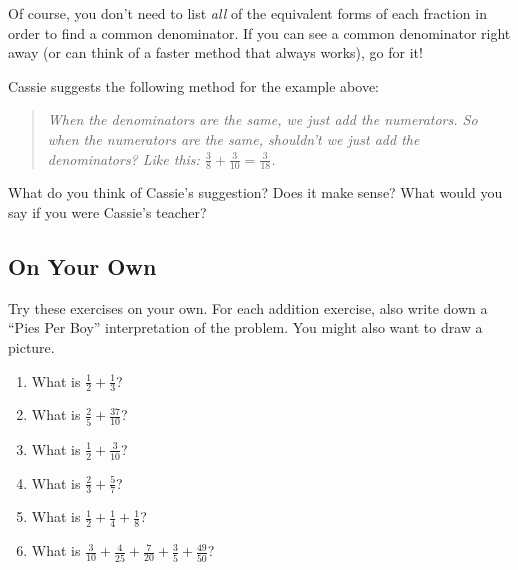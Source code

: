 Of course, you don't need to list \emph{all} of the equivalent forms of each
fraction in order to find a common denominator. If you can see a common
denominator right away (or can think of a faster method that always works), go for it!

\begin{thinkpair*}
Cassie suggests the following method for the example above:

\begin{quotation}
\emph{When the denominators are the same, we just add the numerators.  So when the numerators are the same, shouldn't we just add the denominators?  Like this: $\frac 38 + \frac 3{10} = \frac 3{18}$.
}\end{quotation}

What do you think of Cassie's suggestion?  Does it make sense?  What would you say if you were Cassie's teacher?
\end{thinkpair*}



\subsection*{On Your Own}
Try these exercises on your own.  For each addition exercise, also write down a ``Pies Per Boy'' interpretation of the problem.  You might also want to draw a picture.

\begin{enumerate}
\item
What is $\frac 1 2 + \frac 1 3$?\\

\item
What is $\frac 2 5 + \frac {37}{10}$?\\

\item
What is $\frac 1 2 + \frac 3{10}$?\\

\item
What is $\frac 2 3 + \frac 5 7 $?\\

\item
What is $\frac 1 2 + \frac 1 4 + \frac 1 8$?\\

\item
What is $\frac 3{10} + \frac 4{25} + \frac 7{20} + \frac 35 + \frac{49}{50}$?\\
\end{enumerate}

